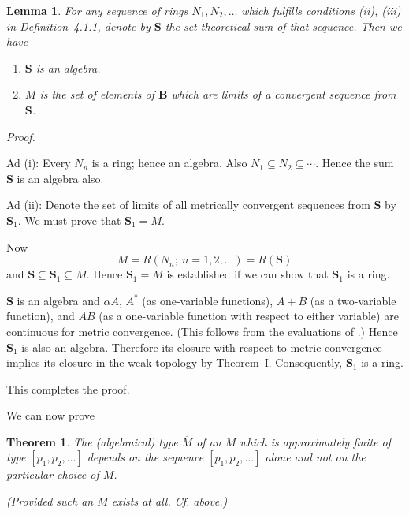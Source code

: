 \documentclass[b5paper,twoside]{article}
\newcommand{\thmref}[2]{\hyperref[#1]{\mbox{Theorem~#2}}}
\newcommand{\defref}[2]{\hyperref[#1]{\mbox{Definition~#2}}}
\theoremstyle{mvnplain}
\newtheorem{theorem}{Theorem}
\newtheorem{lemma}{Lemma}[section]
\renewenvironment{proof}[1][Proof]{%
  \par\addvspace{0.35\baselineskip}%
  \noindent\textit{#1.}\ \normalfont\ignorespaces
}{%
  \par\addvspace{0.35\baselineskip}%
}
\newcommand{\M}{\mathbf M}
\newcommand{\N}{\mathbf N}
\newcommand{\R}{\mathbf R}
\def\M{M}%
\def\N{N}%
\def\R{R}%
\begin{document}
\begin{lemma}\label{lem:4.1.4}
For any sequence of rings \(\N_1,\N_2,\ldots\) which fulfills conditions (ii),
(iii) in \defref{def:4.1.1}{4.1.1}, denote by \(\mathbf S\) the set theoretical
sum of that sequence. Then we have
\begin{enumerate}[label=\((\roman*)\)]
\item \(\mathbf S\) is an algebra.
\item \(\M\) is the set of elements of \(\mathbf B\) which are limits of a
convergent sequence from \(\mathbf S\).
\end{enumerate}
\end{lemma}

\begin{proof}
Ad (i): Every \(\N_n\) is a ring; hence an algebra. Also
\(\N_1\subseteq\N_2\subseteq\cdots\). Hence the sum \(\mathbf S\) is an
algebra also.

Ad (ii): Denote the set of limits of all metrically convergent sequences from
\(\mathbf S\) by \(\mathbf S_1\). We must prove that \(\mathbf S_1=\M\).

Now
\[
  \M=\R(\N_n;\ n=1,2,\ldots)=\R(\mathbf S)
\]
and \(\mathbf S\subseteq\mathbf S_1\subseteq\M\). Hence
\(\mathbf S_1=\M\) is established if we can show that \(\mathbf S_1\) is a
ring.

\(\mathbf S\) is an algebra and \(\alpha A\), \(A^*\) (as one-variable
functions), \(A+B\) (as a two-variable function), and \(AB\) (as a
one-variable function with respect to either variable) are continuous for
metric convergence. (This follows from the evaluations of
\cite[p.~242, property~II\(^{\mathrm o}\)]{ref6}.) Hence \(\mathbf S_1\) is
also an algebra. Therefore its closure with respect to metric convergence
implies its closure in the weak topology by \thmref{thm:I}{I}. Consequently,
\(\mathbf S_1\) is a ring.

This completes the proof.
\end{proof}

We can now prove

\begin{theorem}\label{thm:XI}
The (algebraical) type \(\overline{\M}\) of an \(\M\) which is approximately
finite of type \([p_1,p_2,\ldots]\) depends on the sequence
\([p_1,p_2,\ldots]\) alone and not on the particular choice of \(\M\).

(Provided such an \(\M\) exists at all. Cf. above.)
\end{theorem}
\end{document}
